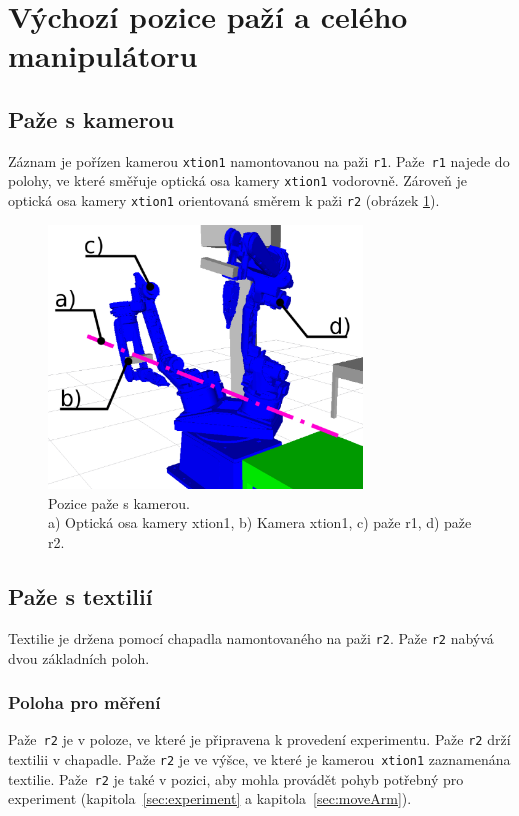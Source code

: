 \documentclass[10pt,a4paper,titlepage,oneside]{report}
\begin{document}
\section{Výchozí pozice paží a celého manipulátoru}

\subsection{Paže s kamerou}
\label{sec:posArmR1}
Záznam je pořízen kamerou \verb|xtion1| namontovanou na paži \verb|r1|. Paže~\verb|r1| najede do polohy, ve které směřuje optická osa kamery \verb|xtion1| vodorovně. Zároveň je optická osa kamery \verb|xtion1| orientovaná směrem k paži \verb|r2| (obrázek \ref{fig:OptOsa}). \\
\begin{figure}[H]
	\centering  	
  	\includegraphics[height=7cm]{pictures/opOsa.eps}
  	\caption{Pozice paže s kamerou.\\a) Optická osa kamery xtion1, b) Kamera xtion1, c) paže r1, d) paže r2.}
  	\label{fig:OptOsa}
\end{figure}

\newpage
\subsection{Paže s textilií}
Textilie je držena pomocí chapadla namontovaného na paži \verb|r2|. Paže \verb|r2| nabývá dvou základních poloh. 
\subsubsection{Poloha pro měření}
Paže~\verb|r2| je v poloze, ve které je připravena k provedení experimentu. Paže \verb|r2| drží textilii v chapadle. Paže \verb|r2| je ve výšce, ve které je kamerou~\verb|xtion1| zaznamenána textilie. Paže~\verb|r2| je také v pozici, aby mohla provádět pohyb potřebný pro experiment (kapitola~\ref{sec:experiment} a kapitola~\ref{sec:moveArm}).
\end{document}
